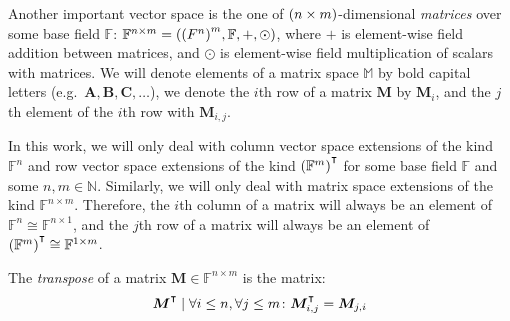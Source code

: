 Another important vector space is the one of \(\Parens*{n \times m}\)-dimensional \emph{matrices} 
over some base field \(\mathbb{F}\): 
\(\mathbb{F}^{n \times m} = \Tuple{{\Parens*{F^n}}^m, \mathbb{F}, +, \odot}\), where \(+\) is 
element-wise field addition between matrices, and \(\odot \) is element-wise field multiplication 
of scalars with matrices.
We will denote elements of a matrix space \(\mathbb{M}\) by bold capital letters 
(e.g.\  \(\bm{A}, \bm{B}, \bm{C}, \dots \)), we denote the \(i\)th row of a matrix \(\bm{M}\) by 
\(\bm{M}_{i}\), 
and the \(j\)th element of the \(i\)th row with \(\bm{M}_{i,j}\).

In this work, we will only deal with column vector space extensions of the kind \(\mathbb{F}^n\) 
and row vector space extensions of the kind \(\Parens*{\mathbb{F}^m}^{\transpose}\) for some 
base field \(\mathbb{F}\) and some \(n, m \in \mathbb{N}\).
Similarly, we will only deal with matrix space extensions of the kind \(\mathbb{F}^{n \times m}\).
Therefore, the \(i\)th column of a matrix will always be an element of 
\(\mathbb{F}^{n} \cong \mathbb{F}^{n \times 1}\), and the \(j\)th row of a matrix will always be an
element of \(\Parens*{\mathbb{F}^m}^{\transpose} \cong \mathbb{F}^{1 \times m}\).

\begin{definition}
  The \emph{transpose} of a matrix \(\bm{M} \in \mathbb{F}^{n \times m}\) is the matrix:
  \[\bm{M}^{\transpose} \mid 
  \forall i \le n, \forall j \le m\colon \bm{M}^{\transpose}_{i,j} = \bm{M}_{j,i}\]
\end{definition}

